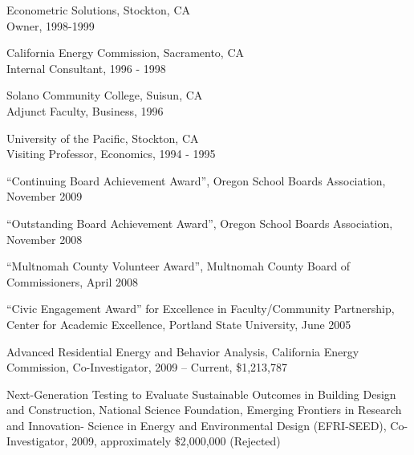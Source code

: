 \documentclass[Computer Science]{vita}
\begin{document}
\begin{vita}
\begin{Experience}
  \item Econometric Solutions, Stockton, CA\\
    Owner, 1998-1999
		
  \item California Energy Commission, Sacramento, CA\\
    Internal Consultant, 1996 - 1998
	
  \item Solano Community College, Suisun, CA\\
    Adjunct Faculty, Business, 1996
		
  \item University of the Pacific, Stockton, CA\\
    Visiting Professor, Economics, 1994 - 1995

  \end{Experience}

  \begin{Honors}

  \item ``Continuing Board Achievement Award'', Oregon School Boards Association, November 2009

\item ``Outstanding Board Achievement Award'', Oregon School Boards Association, November 2008

\item ``Multnomah County Volunteer Award'', Multnomah County Board of Commissioners, April 2008

  \item ``Civic Engagement Award'' for Excellence in Faculty/Community
    Partnership, Center for Academic Excellence, Portland State
    University, June 2005

  \end{Honors}

  \begin{Grants and Sponsored Research}

\item Advanced Residential Energy and Behavior Analysis, California Energy Commission, Co-Investigator, 2009 -- Current, \$1,213,787
  
\item Next-Generation Testing to Evaluate Sustainable Outcomes in Building Design and Construction, National Science Foundation, Emerging Frontiers in Research and Innovation- Science in Energy and Environmental Design (EFRI-SEED), Co-Investigator, 2009, approximately \$2,000,000 (Rejected)


\end{Grants and Sponsored Research}
\end{vita}
\end{document}
